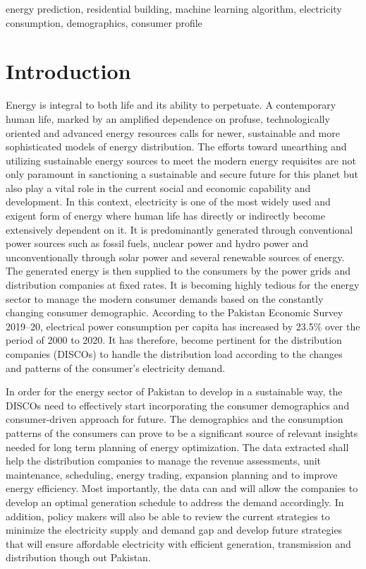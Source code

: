\documentclass[conference]{IEEEtran}
\begin{document}
\begin{IEEEkeywords}
energy prediction, residential building, machine learning algorithm, electricity consumption, demographics, consumer profile
\end{IEEEkeywords}



\section{Introduction}
Energy is integral to both life and its ability to perpetuate. A contemporary human life, marked by an amplified dependence on profuse, technologically oriented and advanced energy resources calls for newer, sustainable and more sophisticated models of energy distribution. The efforts toward unearthing and utilizing sustainable energy sources to meet the modern energy requisites are not only paramount in sanctioning a sustainable and secure future for this planet but also play a vital role in the current social and economic capability and development. In this context, electricity is one of the most widely used and exigent form of energy where human life has directly or indirectly become extensively dependent on it. It is predominantly generated through conventional power sources such as fossil fuels, nuclear power and hydro power and unconventionally through solar power and several renewable sources of energy. The generated energy is then supplied to the consumers by the power grids and distribution companies at fixed rates. It is becoming highly tedious for the energy sector to manage the modern consumer demands based on the constantly changing consumer demographic. According to the Pakistan Economic Survey 2019–20, electrical power consumption per capita has increased by 23.5\% \cite{data} over the period of 2000 to 2020. It has therefore, become pertinent for the distribution companies (DISCOs) to handle the distribution load according to the changes and patterns of the consumer’s electricity demand.  

In order for the energy sector of Pakistan to develop in a sustainable way, the DISCOs need to effectively start incorporating the consumer demographics and consumer-driven approach for future. The demographics and the consumption patterns of the consumers can prove to be a significant source of relevant insights needed for long term planning of energy optimization. The data extracted shall help the distribution companies to manage the revenue assessments, unit maintenance, scheduling, energy trading, expansion planning and to improve energy efficiency. Most importantly, the data can and will allow the companies to develop an optimal generation schedule to address the demand accordingly. In addition, policy makers will also be able to review the current strategies to minimize the electricity supply and demand gap and develop future strategies that will ensure affordable electricity with efficient generation, transmission and distribution though out Pakistan. 
\end{document}

